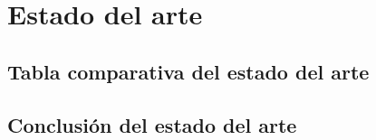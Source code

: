 
\section{Estado del arte} \label{sec:estado_arte} %



\subsection{Tabla comparativa del estado del arte} \label{sec:tabla_estado_arte} %



\subsection{Conclusión del estado del arte} \label{sec:conclusion_estado_arte} %

